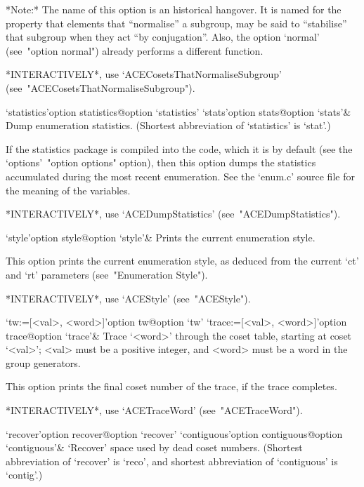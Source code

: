 *Note:*
The name of this option is an historical hangover. It is named for the
property that elements that ``normalise'' a subgroup, may be  said  to
``stabilise'' that subgroup when they act  ``by  conjugation''.  Also,
the option `normal' (see~"option normal") already performs a different
function.

*INTERACTIVELY*,         use          `ACECosetsThatNormaliseSubgroup'
(see~"ACECosetsThatNormaliseSubgroup").

\>`statistics'{option statistics}@{option `statistics'}
\>`stats'{option stats}@{option `stats'}&
Dump enumeration statistics.
(Shortest abbreviation of `statistics' is `stat'.)

If the statistics package is compiled into the {\ACE} code,  which  it
is by default (see the `options'~"option options" option),  then  this
option  dumps  the  statistics  accumulated  during  the  most  recent
enumeration. See the `enum.c' source  file  for  the  meaning  of  the
variables.

*INTERACTIVELY*, use `ACEDumpStatistics' (see~"ACEDumpStatistics").

\>`style'{option style}@{option `style'}&
Prints the current enumeration style.

This option prints the current enumeration style, as deduced from  the
current `ct' and `rt' parameters (see~"Enumeration Style").

*INTERACTIVELY*, use `ACEStyle' (see~"ACEStyle").

\>`tw:=[<val>, <word>]'{option tw}@{option `tw'}
\>`trace:=[<val>, <word>]'{option trace}@{option `trace'}&
Trace `<word>' through the coset table,  starting  at  coset  `<val>';
<val> must be a positive integer, and <word> must be  a  word  in  the
group generators.

This option prints the final coset number of the trace, if  the  trace
completes.

*INTERACTIVELY*, use `ACETraceWord' (see~"ACETraceWord").

\enditems


\beginitems

\>`recover'{option recover}@{option `recover'}
\>`contiguous'{option contiguous}@{option `contiguous'}&
`Recover' space used by dead coset numbers.
(Shortest  abbreviation  of  `recover'   is   `reco',   and   shortest
abbreviation of `contiguous' is `contig'.)

